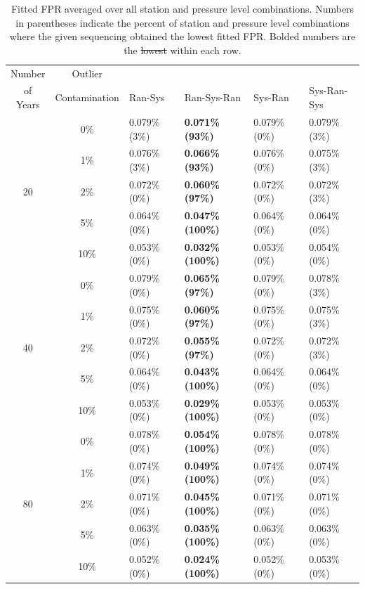 \documentclass[12pt]{article}
\providecommand{\DIFaddtex}[1]{{\protect\color{blue}\uwave{#1}}} %
\providecommand{\DIFdeltex}[1]{{\protect\color{red}\sout{#1}}}                      %
\providecommand{\DIFaddFL}[1]{\DIFadd{#1}} %
\providecommand{\DIFdelFL}[1]{\DIFdel{#1}} %
\providecommand{\DIFaddbeginFL}{} %
\providecommand{\DIFaddendFL}{} %
\providecommand{\DIFdelbeginFL}{} %
\providecommand{\DIFdelendFL}{} %
\providecommand{\DIFadd}[1]{\texorpdfstring{\DIFaddtex{#1}}{#1}} %
\providecommand{\DIFdel}[1]{\texorpdfstring{\DIFdeltex{#1}}{}} %
\begin{document}
\begin{landscape}
\begin{table}[ht]
	\centering
	\begin{tabular}{cc|llll}
		\hline
		Number & Outlier & & & &\\ 
		of Years & Contamination & Ran-Sys & Ran-Sys-Ran & Sys-Ran & Sys-Ran-Sys\\ 
		\hline
		& 0\% & 0.079\% (3\%) & \textbf{0.071\% (93\%)} & 0.079\% (0\%) & 0.079\% (3\%) \\ 
		& 1\% & 0.076\% (3\%) & \textbf{0.066\% (93\%)} & 0.076\% (0\%) & 0.075\% (3\%) \\ 
		20 & 2\% & 0.072\% (0\%) & \textbf{0.060\% (97\%)} & 0.072\% (0\%) & 0.072\% (3\%) \\ 
		& 5\% & 0.064\% (0\%) & \textbf{0.047\% (100\%)} & 0.064\% (0\%) & 0.064\% (0\%) \\ 
		& 10\% & 0.053\% (0\%) & \textbf{0.032\% (100\%)} & 0.053\% (0\%) & 0.054\% (0\%) \\ 
		\hline
		& 0\% & 0.079\% (0\%) & \textbf{0.065\% (97\%)} & 0.079\% (0\%) & 0.078\% (3\%) \\ 
		& 1\% & 0.075\% (0\%) & \textbf{0.060\% (97\%)} & 0.075\% (0\%) & 0.075\% (3\%) \\ 
		40 & 2\% & 0.072\% (0\%) & \textbf{0.055\% (97\%)} & 0.072\% (0\%) & 0.072\% (3\%) \\ 
		& 5\% & 0.064\% (0\%) & \textbf{0.043\% (100\%)} & 0.064\% (0\%) & 0.064\% (0\%) \\ 
		& 10\% & 0.053\% (0\%) & \textbf{0.029\% (100\%)} & 0.053\% (0\%) & 0.053\% (0\%) \\ 
		\hline
		& 0\% & 0.078\% (0\%) & \textbf{0.054\% (100\%)} & 0.078\% (0\%) & 0.078\% (0\%) \\ 
		& 1\% & 0.074\% (0\%) & \textbf{0.049\% (100\%)} & 0.074\% (0\%) & 0.074\% (0\%) \\ 
		80 & 2\% & 0.071\% (0\%) & \textbf{0.045\% (100\%)} & 0.071\% (0\%) & 0.071\% (0\%) \\ 
		& 5\% & 0.063\% (0\%) & \textbf{0.035\% (100\%)} & 0.063\% (0\%) & 0.063\% (0\%) \\ 
		& 10\% & 0.052\% (0\%) & \textbf{0.024\% (100\%)} & 0.052\% (0\%) & 0.053\% (0\%) \\
		\hline
	\end{tabular}
	\caption{Fitted FPR averaged over all station and pressure level combinations.  Numbers in parentheses indicate the percent of station and pressure level combinations where the given sequencing obtained the lowest fitted FPR. Bolded numbers are the \DIFdelbeginFL \DIFdelFL{lowest }\DIFdelendFL \DIFaddbeginFL \DIFaddFL{best }\DIFaddendFL within each row.}
	\label{tab:fitFPR}
\end{table}
\end{landscape}
\end{document}
